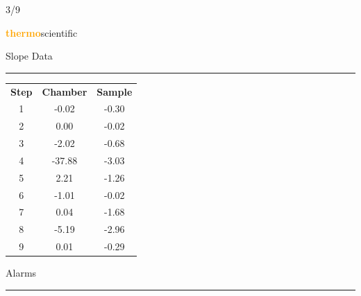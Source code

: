 \documentclass[UTF8,10pt,a4paper,fontset=fandol]{ctexart}
\newcommand{\fieldvalue}[1]{#1}
\newcommand{\handwritten}[1]{#1}
\begin{document}
\hfill
\handwritten{3/9}

\newpage

\begin{flushright}
\textcolor{orange}{\textsf{\textbf{thermo}}}\textsf{scientific}
\end{flushright}

\noindent
\begin{minipage}[t]{0.43\textwidth}
\centering
Slope Data

\rule{\textwidth}{0.4pt}

\begin{tabular}{c c c}
\textbf{Step} & \textbf{Chamber} & \textbf{Sample} \\
1 &
\fieldvalue{-0.02} &
\fieldvalue{-0.30} \\
2 &
\fieldvalue{0.00} &
\fieldvalue{-0.02} \\
3 &
\fieldvalue{-2.02} &
\fieldvalue{-0.68} \\
4 &
\fieldvalue{-37.88} &
\fieldvalue{-3.03} \\
5 &
\fieldvalue{2.21} &
\fieldvalue{-1.26} \\
6 &
\fieldvalue{-1.01} &
\fieldvalue{-0.02} \\
7 &
\fieldvalue{0.04} &
\fieldvalue{-1.68} \\
8 &
\fieldvalue{-5.19} &
\fieldvalue{-2.96} \\
9 &
\fieldvalue{0.01} &
\fieldvalue{-0.29}
\end{tabular}
\end{minipage}
\hfill
\begin{minipage}[t]{0.48\textwidth}
\centering
Alarms

\rule{\textwidth}{0.4pt}
\end{minipage}
\end{document}
